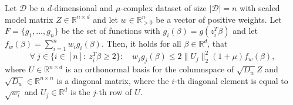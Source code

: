 \begin{lemma}
    \label{lemma:g-bounds-1}
    Let $\mathcal{D}$ be a $d$-dimensional and $\mu$-complex dataset of size
    $|\mathcal{D}|=n$ with scaled model matrix
    $Z \in \mathbb{R}^{n \times d}$ and let $w \in \mathbb{R}^n_{>0}$
    be a vector of positive weights.
    Let $F = \{g_1, ..., g_n\}$ be the set of functions with
    $g_i(\beta) = g(z_i^T \beta)$ and let
    $f_w(\beta) = \sum_{i=1}^n w_ig_i(\beta)$.
    Then, it holds for all $\beta \in \mathbb{R}^d$, that
    \begin{equation*}
        \forall\ j \in \{i \in [n]:\ z_i^T \beta \geq 2 \}:\quad
        w_jg_j(\beta) \leq 2 \lVert U_j \rVert_2^2(1 + \mu)f_w(\beta),
    \end{equation*}
    where $U \in \mathbb{R}^{n \times d}$ is an orthonormal basis for
    the columnspace of $\sqrt{D_w}Z$ and $\sqrt{D_w} \in \mathbb{R}^{n \times n}$
    is a diagonal matrix, where the $i$-th diagonal element is equal to
    $\sqrt{w_i}$ and $U_j \in \mathbb{R}^d$ is the $j$-th row of $U$.
\end{lemma}
